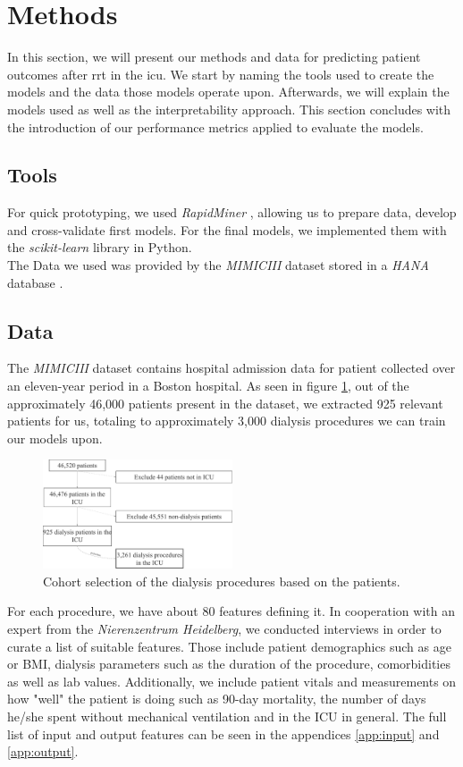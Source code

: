 \documentclass[conference,comsoc]{IEEEtran}
\begin{document}
\section{Methods}
\label{sec:methods}
In this section, we will present our methods and data for predicting patient outcomes after \gls{rrt} in the \gls{icu}.
We start by naming the tools used to create the models and the data those models operate upon.
Afterwards, we will explain the models used as well as the interpretability approach.
This section concludes with the introduction of our performance metrics applied to evaluate the models.

\subsection{Tools}
For quick prototyping, we used \emph{RapidMiner} \cite{RapidMiner}, allowing us to prepare data, develop and cross-validate first models. 
For the final models, we implemented them with the \emph{scikit-learn} library \cite{SKLearn} in Python. \\
The Data we used was provided by the \emph{MIMICIII} dataset \cite{Johnson2016} stored in a \emph{HANA} database \cite{Farber2012}.


\subsection{Data}
The \emph{MIMICIII} dataset contains hospital admission data for patient collected over an eleven-year period in a Boston hospital. 
As seen in figure \ref{fig:cohort}, out of the approximately 46,000 patients present in the dataset, we extracted 925 relevant patients for us, totaling to approximately 3,000 dialysis procedures we can train our models upon.

\begin{figure}[h]
	\centering
	\includegraphics[width=0.5\textwidth]{cohort.pdf}
	\vspace*{-6mm}
	\caption{Cohort selection of the dialysis procedures based on the patients.}
	\label{fig:cohort}
\end{figure}
For each procedure, we have about 80 features defining it.
In cooperation with an expert from the \emph{Nierenzentrum Heidelberg}, we conducted interviews in order to curate a list of suitable features.
Those include patient demographics such as age or BMI, dialysis parameters such as the duration of the procedure, comorbidities as well as lab values. 
Additionally, we include patient vitals and measurements on how "well" the patient is doing such as 90-day mortality, the number of days he/she spent without mechanical ventilation and in the ICU in general.
The full list of input and output features can be seen in the appendices \ref{app:input} and \ref{app:output}.
\end{document}
